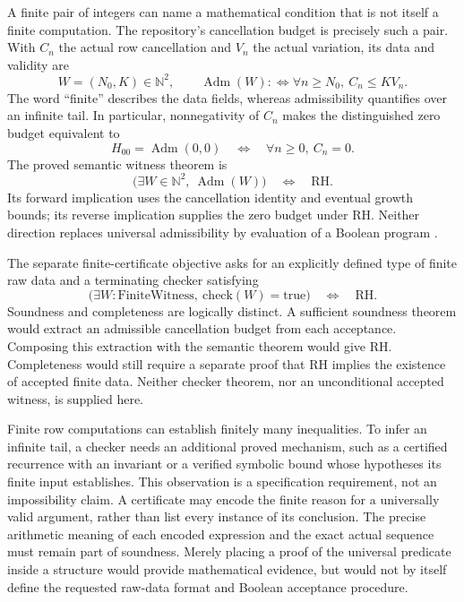 \label{front:finite}

A finite pair of integers can name a mathematical condition that is not
itself a finite computation. The repository's cancellation budget is
precisely such a pair. With $C_n$ the actual row cancellation and $V_n$
the actual variation, its data and validity are
\begin{equation}
 W=(N_0,K)\in\mathbb N^2,\qquad
 \operatorname{Adm}(W):\Longleftrightarrow
 \forall n\geq N_0,\ C_n\leq K V_n.
\end{equation}
The word ``finite'' describes the data fields, whereas admissibility
quantifies over an infinite tail. In particular, nonnegativity of $C_n$
makes the distinguished zero budget equivalent to
\begin{equation}
 H_{00}=\operatorname{Adm}(0,0)
 \quad\Longleftrightarrow\quad\forall n\geq0,\ C_n=0.
\end{equation}
The proved semantic witness theorem is
\begin{equation}
 \bigl(\exists W\in\mathbb N^2,\ \operatorname{Adm}(W)\bigr)
 \quad\Longleftrightarrow\quad\mathrm{RH}.
\end{equation}
Its forward implication uses the cancellation identity and eventual
growth bounds; its reverse implication supplies the zero budget under
RH. Neither direction replaces universal admissibility by evaluation
of a Boolean program \cite{source}.

The separate finite-certificate objective asks for an explicitly defined
type of finite raw data and a terminating checker satisfying
\begin{equation}\label{front:checker-target}
 \bigl(\exists W:\mathrm{FiniteWitness},\
       \mathrm{check}(W)=\mathrm{true}\bigr)
 \quad\Longleftrightarrow\quad\mathrm{RH}.
\end{equation}
Soundness and completeness are logically distinct. A sufficient soundness
theorem would extract an admissible cancellation budget from each
acceptance. Composing this extraction with the semantic theorem would
give RH. Completeness would still require a separate proof that RH
implies the existence of accepted finite data. Neither checker theorem,
nor an unconditional accepted witness, is supplied here.

Finite row computations can establish finitely many inequalities. To
infer an infinite tail, a checker needs an additional proved mechanism,
such as a certified recurrence with an invariant or a verified symbolic
bound whose hypotheses its finite input establishes. This observation is
a specification requirement, not an impossibility claim. A certificate
may encode the finite reason for a universally valid argument, rather
than list every instance of its conclusion. The precise arithmetic
meaning of each encoded expression and the exact actual sequence must
remain part of soundness. Merely placing a proof of the universal
predicate inside a structure would provide mathematical evidence, but
would not by itself define the requested raw-data format and Boolean
acceptance procedure.

